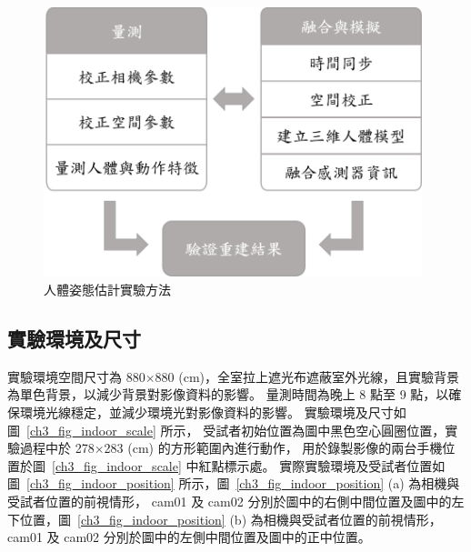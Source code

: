 \begin{figure}[!ht]
   \centering
   \includegraphics[width=11cm]{figure/ch3_fig_exp_flow.png}
    \caption[人體姿態估計實驗方法]{人體姿態估計實驗方法}
    \label{ch3_fig_exp_flow}
\end{figure}


\subsection{實驗環境及尺寸}
實驗環境空間尺寸為 880$\times$880 (cm)，全室拉上遮光布遮蔽室外光線，且實驗背景為單色背景，以減少背景對影像資料的影響。
量測時間為晚上 8 點至 9 點，以確保環境光線穩定，並減少環境光對影像資料的影響。
實驗環境及尺寸如圖~\ref{ch3_fig_indoor_scale} 所示，
受試者初始位置為圖中黑色空心圓圈位置，實驗過程中於 278$\times$283 (cm) 的方形範圍內進行動作，
用於錄製影像的兩台手機位置於圖~\ref{ch3_fig_indoor_scale} 中紅點標示處。
實際實驗環境及受試者位置如圖~\ref{ch3_fig_indoor_position} 所示，圖~\ref{ch3_fig_indoor_position} (a) 為相機與受試者位置的前視情形， cam01 及 cam02 分別於圖中的右側中間位置及圖中的左下位置，圖~\ref{ch3_fig_indoor_position} (b) 為相機與受試者位置的前視情形， cam01 及 cam02 分別於圖中的左側中間位置及圖中的正中位置。

